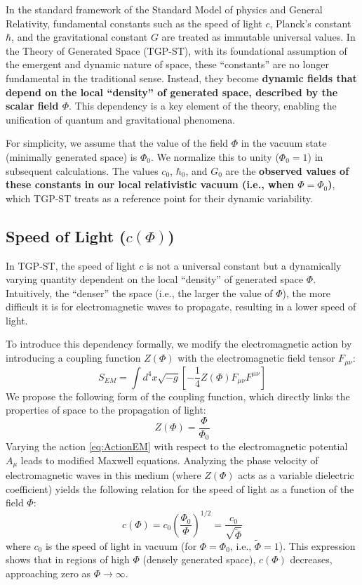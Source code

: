 \documentclass[11pt,a4paper]{article}
\begin{document}
In the standard framework of the Standard Model of physics and General Relativity, fundamental constants such as the speed of light $c$, Planck’s constant $\hbar$, and the gravitational constant $G$ are treated as immutable universal values. In the Theory of Generated Space (TGP-ST), with its foundational assumption of the emergent and dynamic nature of space, these “constants” are no longer fundamental in the traditional sense. Instead, they become \textbf{dynamic fields that depend on the local “density” of generated space, described by the scalar field $\Phi$}. This dependency is a key element of the theory, enabling the unification of quantum and gravitational phenomena.

For simplicity, we assume that the value of the field $\Phi$ in the vacuum state (minimally generated space) is $\Phi_0$. We normalize this to unity ($\Phi_0 = 1$) in subsequent calculations. The values $c_0$, $\hbar_0$, and $G_0$ are the \textbf{observed values of these constants in our local relativistic vacuum (i.e., when $\Phi = \Phi_0$)}, which TGP-ST treats as a reference point for their dynamic variability.

\subsection{Speed of Light ($c(\Phi)$)}
In TGP-ST, the speed of light $c$ is not a universal constant but a dynamically varying quantity dependent on the local “density” of generated space $\Phi$. Intuitively, the “denser” the space (i.e., the larger the value of $\Phi$), the more difficult it is for electromagnetic waves to propagate, resulting in a lower speed of light.

To introduce this dependency formally, we modify the electromagnetic action by introducing a coupling function $Z(\Phi)$ with the electromagnetic field tensor $F_{\mu\nu}$:
\begin{equation}
    S_{EM} = \int d^4x \sqrt{-g} \left[ -\frac{1}{4} Z(\Phi) F_{\mu\nu} F^{\mu\nu} \right]
    \label{eq:ActionEM}
\end{equation}
We propose the following form of the coupling function, which directly links the properties of space to the propagation of light:
\begin{equation}
    Z(\Phi) = \frac{\Phi}{\Phi_0}
    \label{eq:ZPhi}
\end{equation}
Varying the action \eqref{eq:ActionEM} with respect to the electromagnetic potential $A_\mu$ leads to modified Maxwell equations. Analyzing the phase velocity of electromagnetic waves in this medium (where $Z(\Phi)$ acts as a variable dielectric coefficient) yields the following relation for the speed of light as a function of the field $\Phi$:
\begin{equation}
    c(\Phi) = c_0 \left(\frac{\Phi_0}{\Phi}\right)^{1/2} = \frac{c_0}{\sqrt{\tilde{\Phi}}}
    \label{eq:cPhi}
\end{equation}
where $c_0$ is the speed of light in vacuum (for $\Phi = \Phi_0$, i.e., $\tilde{\Phi} = 1$). This expression shows that in regions of high $\Phi$ (densely generated space), $c(\Phi)$ decreases, approaching zero as $\Phi \rightarrow \infty$.
\end{document}

